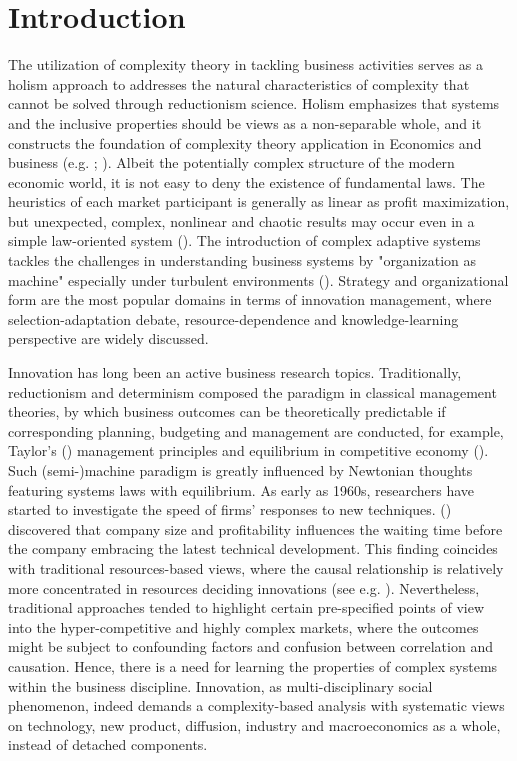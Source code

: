 \documentclass[utf8,english]{gradu3}
\begin{document}
\mainmatter

\chapter{Introduction}

The utilization of complexity theory in tackling business activities serves as a holism approach to addresses the natural characteristics of complexity that cannot be solved through reductionism science. Holism emphasizes that systems and the inclusive properties should be views as a non-separable whole, and it constructs the foundation of complexity theory application in Economics and business (e.g. \cite{smuts1926holism}; \cite{auyang1999foundations}). Albeit the potentially complex structure of the modern economic world, it is not easy to deny the existence of fundamental laws. The heuristics of each market participant is generally as linear as profit maximization, but unexpected, complex, nonlinear and chaotic results may occur even in a simple law-oriented system (\cite{nicolis1995introduction}). The introduction of complex adaptive systems tackles the challenges in understanding business systems by "organization as machine" especially under turbulent environments (\cite{dooley1997complex}). Strategy and organizational form are the most popular domains in terms of innovation management, where selection-adaptation debate, resource-dependence and knowledge-learning perspective are widely discussed. 

 Innovation has long been an active business research topics. Traditionally, reductionism and determinism composed the paradigm in classical management theories, by which business outcomes can be theoretically predictable if corresponding planning, budgeting and management are conducted, for example, Taylor's (\citeyear{taylor1911shop}) management principles and equilibrium in competitive economy (\cite{arrow1954existence}). Such (semi-)machine paradigm is greatly influenced by Newtonian thoughts featuring systems laws with equilibrium. As early as 1960s, researchers have started to investigate the speed of firms' responses to new techniques. \citeauthor{mansfield1963speed} (\citeyear{mansfield1963speed}) discovered that company size and profitability influences the waiting time before the company embracing the latest technical development. This finding coincides with traditional resources-based views, where the causal relationship is relatively more concentrated in resources deciding innovations (see e.g. \cite{wernerfelt1984resource}). Nevertheless, traditional approaches tended to highlight certain pre-specified points of view into the hyper-competitive and highly complex markets, where the outcomes might be subject to confounding factors and confusion between correlation and causation. Hence, there is a need for learning the properties of complex systems within the business discipline. Innovation, as multi-disciplinary social phenomenon, indeed demands a complexity-based analysis with systematic views on technology, new product, diffusion, industry and macroeconomics as a whole, instead of detached components.
\end{document}
